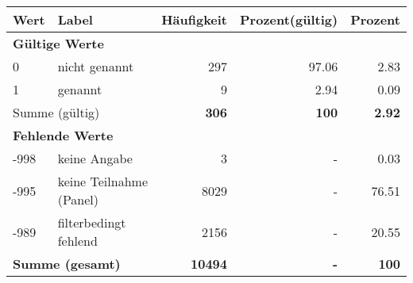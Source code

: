      \begin{longtable}{lXrrr}
     \toprule
     \textbf{Wert} & \textbf{Label} & \textbf{Häufigkeit} & \textbf{Prozent(gültig)} & \textbf{Prozent} \\
     \endhead
     \midrule
     \multicolumn{5}{l}{\textbf{Gültige Werte}}\\

     0 &
     \multicolumn{1}{X}{ nicht genannt   } &


       \num{297} &
       \num[round-mode=places,round-precision=2]{97,06} &
         \num[round-mode=places,round-precision=2]{2,83} \\

     1 &
     \multicolumn{1}{X}{ genannt   } &


       \num{9} &
       \num[round-mode=places,round-precision=2]{2,94} &
         \num[round-mode=places,round-precision=2]{0,09} \\
     \midrule
     \multicolumn{2}{l}{Summe (gültig)} &
       \textbf{\num{306}} &
     \textbf{100} &
       \textbf{\num[round-mode=places,round-precision=2]{2,92}} \\
     \multicolumn{5}{l}{\textbf{Fehlende Werte}}\\
       -998 &
       keine Angabe &
         \num{3} &
        - &
         \num[round-mode=places,round-precision=2]{0,03} \\
       -995 &
       keine Teilnahme (Panel) &
         \num{8029} &
        - &
         \num[round-mode=places,round-precision=2]{76,51} \\
       -989 &
       filterbedingt fehlend &
         \num{2156} &
        - &
         \num[round-mode=places,round-precision=2]{20,55} \\
     \midrule
     \multicolumn{2}{l}{\textbf{Summe (gesamt)}} &
          \textbf{\num{10494}} &
        \textbf{-} &
        \textbf{100} \\
     \bottomrule
     \end{longtable}
     
